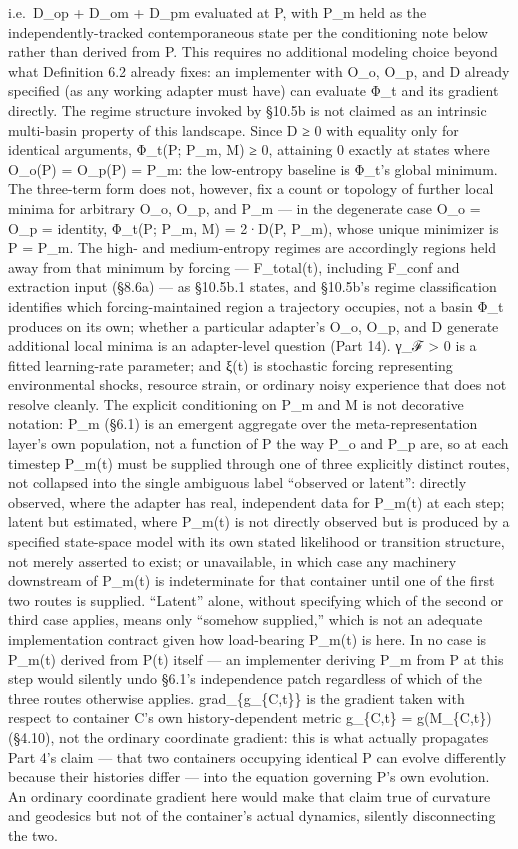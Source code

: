 \documentclass[
]{article}
\begin{document}
i.e.~D\_op + D\_om + D\_pm evaluated at P, with P\_m held as the
independently-tracked contemporaneous state per the conditioning note
below rather than derived from P. This requires no additional modeling
choice beyond what Definition 6.2 already fixes: an implementer with
O\_o, O\_p, and D already specified (as any working adapter must have)
can evaluate Φ\_t and its gradient directly. The regime structure
invoked by §10.5b is not claimed as an intrinsic multi-basin property of
this landscape. Since D ≥ 0 with equality only for identical arguments,
Φ\_t(P; P\_m, M) ≥ 0, attaining 0 exactly at states where O\_o(P) =
O\_p(P) = P\_m: the low-entropy baseline is Φ\_t's global minimum. The
three-term form does not, however, fix a count or topology of further
local minima for arbitrary O\_o, O\_p, and P\_m --- in the degenerate case
O\_o = O\_p = identity, Φ\_t(P; P\_m, M) = 2·D(P, P\_m), whose unique
minimizer is P = P\_m. The high- and medium-entropy regimes are
accordingly regions held away from that minimum by forcing --- F\_total(t),
including F\_conf and extraction input (§8.6a) --- as §10.5b.1 states,
and §10.5b's regime classification identifies which forcing-maintained
region a trajectory occupies, not a basin Φ\_t produces on its own;
whether a particular adapter's O\_o, O\_p, and D generate additional local
minima is an adapter-level question (Part 14). γ\_ℱ \textgreater{} 0 is a fitted
learning-rate parameter; and ξ(t) is stochastic forcing representing
environmental shocks, resource strain, or ordinary noisy experience that
does not resolve cleanly. The explicit conditioning on P\_m and M is not
decorative notation: P\_m (§6.1) is an emergent aggregate over the
meta-representation layer's own population, not a function of P the way
P\_o and P\_p are, so at each timestep P\_m(t) must be supplied through
one of three explicitly distinct routes, not collapsed into the single
ambiguous label ``observed or latent'': directly observed, where the
adapter has real, independent data for P\_m(t) at each step; latent but
estimated, where P\_m(t) is not directly observed but is produced by a
specified state-space model with its own stated likelihood or transition
structure, not merely asserted to exist; or unavailable, in which case
any machinery downstream of P\_m(t) is indeterminate for that container
until one of the first two routes is supplied. ``Latent'' alone, without
specifying which of the second or third case applies, means only
``somehow supplied,'' which is not an adequate implementation contract
given how load-bearing P\_m(t) is here. In no case is P\_m(t) derived
from P(t) itself --- an implementer deriving P\_m from P at this step
would silently undo §6.1's independence patch regardless of which of the
three routes otherwise applies. grad\_\{g\_\{C,t\}\} is the gradient
taken with respect to container C's own history-dependent metric
g\_\{C,t\} = g(M\_\{C,t\}) (§4.10), not the ordinary coordinate
gradient: this is what actually propagates Part 4's claim --- that two
containers occupying identical P can evolve differently because their
histories differ --- into the equation governing P's own evolution. An
ordinary coordinate gradient here would make that claim true of
curvature and geodesics but not of the container's actual dynamics,
silently disconnecting the two.
\end{document}
